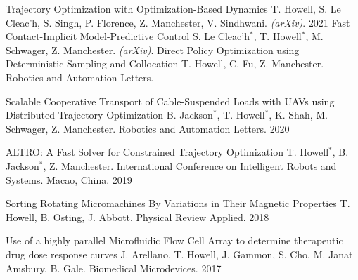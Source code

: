 


\begin{cvhonors}

   \cvhonor
	{Trajectory Optimization with Optimization-Based Dynamics} %
	{T. Howell, S. Le Cleac'h, S. Singh, P. Florence, Z. Manchester, V. Sindhwani. \textit{(arXiv)}.} %
	{}
	{2021} %
   \cvhonor
	{Fast Contact-Implicit Model-Predictive Control} %
	{S. Le Cleac'h$^*$, T. Howell$^*$, M. Schwager, Z. Manchester. \textit{(arXiv)}.} %
	{}
	{} %
  \cvhonor
    {Direct Policy Optimization using Deterministic Sampling and Collocation} %
    {T. Howell, C. Fu, Z. Manchester. Robotics and Automation Letters.} %
    {}
    {} %
    
  \cvhonor
    {Scalable Cooperative Transport of Cable-Suspended Loads with UAVs using Distributed Trajectory Optimization} %
    {B. Jackson$^*$, T. Howell$^*$, K. Shah, M. Schwager, Z. Manchester. Robotics and Automation Letters.} %
    {}
    {2020} %
    
  \cvhonor
    {ALTRO: A Fast Solver for Constrained Trajectory Optimization}
    {T. Howell$^*$, B. Jackson$^*$, Z. Manchester. International Conference on Intelligent Robots and Systems. Macao, China.}
    {}
    {2019}
    
  \cvhonor
    {Sorting Rotating Micromachines By Variations in Their Magnetic Properties}
    {T. Howell, B. Osting, J. Abbott. Physical Review Applied.} 
    {}
    {2018}
    
  \cvhonor
    {Use of a highly parallel Microfluidic Flow Cell Array to determine therapeutic drug dose response curves}
    {J. Arellano, T. Howell, J. Gammon, S. Cho, M. Janat Amsbury, B. Gale. Biomedical Microdevices.}
    {}
    {2017}
    
\end{cvhonors}
